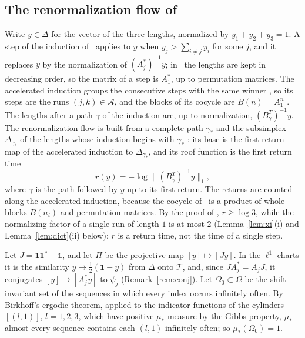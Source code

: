 \documentclass[11pt]{amsart}
\newcommand{\id}{\mathds{1}}
\theoremstyle{definition}
\theoremstyle{remark}
\newcommand{\one}{\mathbf 1}
\newcommand{\cT}{\mathcal T}
\newcommand{\norm}[1]{\lVert #1\rVert}
\begin{document}
\subsection*{The renormalization flow of~\cite{AHSinv}}
Write $y\in\Delta$ for the vector of the three lengths, normalized by $y_1+y_2+y_3=1$. A step of the induction of~\cite[\S3.1]{AHSinv} applies to $y$ when $y_j>\sum_{i\ne j}y_i$ for some $j$, and it replaces $y$ by the normalization of $(A_j^*)^{-1}y$; in~\cite{AHSinv} the lengths are kept in decreasing order, so the matrix of a step is $A_1^*$, up to permutation matrices. The accelerated induction groups the consecutive steps with the same winner \cite[Lemma~8]{AHSinv}, so its steps are the runs $(j,k)\in\mathcal A$, and the blocks of its cocycle are $B(n)=A_1^n$ \cite[\S3.6]{AHSinv}. The lengths after a path $\gamma$ of the induction are, up to normalization, $(B_\gamma^T)^{-1}y$. The renormalization flow is built from a complete path $\gamma_*$ and the subsimplex $\Delta_{\gamma_*}$ of the lengths whose induction begins with $\gamma_*$ \cite[Def.~12]{AHSinv}: its base is the first return map of the accelerated induction to $\Delta_{\gamma_*}$, and its roof function is the first return time
\[
  r(y)=-\log\norm{(B_\gamma^T)^{-1}y}_1,
\]
where $\gamma$ is the path followed by $y$ up to its first return. The returns are counted along the accelerated induction, because the cocycle of~\cite[Thm.~27]{AHSinv} is a product of whole blocks $B(n_i)$ and permutation matrices. By the proof of \cite[Lemma~13]{AHSinv}, $r\ge\log3$, while the normalizing factor of a single run of length $1$ is at most $2$ (Lemma~\ref{lem:xi}(i) and Lemma~\ref{lem:dict}(ii) below): $r$ is a return time, not the time of a single step.

Let $J=\one\one^*-\id$, and let $\Pi$ be the projective map $[y]\mapsto[Jy]$. In the $\ell^1$ charts it is the similarity $y\mapsto\frac12(\one-y)$ from $\Delta$ onto $\cT$, and, since $JA_j^*=A_jJ$, it conjugates $[y]\mapsto[A_j^*y]$ to $\psi_j$ (Remark~\ref{rem:conj}). Let $\Omega_0\subset\Omega$ be the shift-invariant set of the sequences in which every index occurs infinitely often. By Birkhoff's ergodic theorem, applied to the indicator functions of the cylinders $[(l,1)]$, $l=1,2,3$, which have positive $\mu_*$-measure by the Gibbs property, $\mu_*$-almost every sequence contains each $(l,1)$ infinitely often; so $\mu_*(\Omega_0)=1$.
\end{document}
